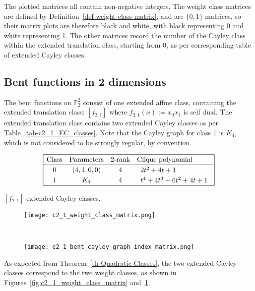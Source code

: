 \documentclass[12pt,a4paper]{article}
\newcommand{\mb}[1]{\mathbb{#1}}
\newcommand{\F}{\mb{F}}
\begin{document}
The plotted matrices all contain non-negative integers.
The weight class matrices are defined by Definition~\ref{def-weight-class-matrix}, and are $\{0,1\}$ matrices,
so their matrix plots are therefore black and white, with black representing 0 and white representing 1.
The other matrices record the number of the Cayley class within the
extended translation class, starting from 0, as per corresponding table of extended Cayley classes.

\subsection{Bent functions in 2 dimensions}
%
The bent functions on $\F_2^2$ consist of one extended affine class, containing the extended translation class: $[f_{2,1}]$
where $f_{2,1}(x) := x_0 x_1$ is self dual.
The extended translation class contains two extended Cayley classes as per Table~\ref{tab-c2_1_EC_classes}.
Note that the Cayley graph for class 1 is $K_4$, which is not considered to be strongly regular, by convention.
\begin{table}[!bhpt] %
\small{
\begin{align*}
\def\arraystretch{1.2}
\begin{array}{|cccl|}
\hline
\text{Class} &
\text{Parameters} &
\text{2-rank} &
\text{Clique polynomial}
\\
\hline
0 &
(4, 1, 0, 0) &
4 &
\begin{array}{l}
2t^{2} + 4t + 1
\end{array}
\\
1 &
K_4 &
4 &
\begin{array}{l}
t^{4} + 4t^{3} + 6t^{2} + 4t + 1
\end{array}
\\
\hline
\end{array}
\end{align*}
}
\caption{$[f_{2,1}]$ extended Cayley classes.}
\label{tab-c2_1_EC_classes}
\end{table}

\begin{figure}[!ht]
\centering
\begin{minipage}{.48\textwidth}
  \centering
  \texttt{[image: c2\_1\_weight\_class\_matrix.png]}
  \label{fig:c2_1_weight_class_matrix}
\end{minipage}%
~~~~
\begin{minipage}{.48\textwidth}
  \centering
  \texttt{[image: c2\_1\_bent\_cayley\_graph\_index\_matrix.png]}
  \label{fig:c2_1_bent_cayley_graph_index_matrix}
\end{minipage}
\end{figure}
As expected from Theorem~\ref{th-Quadratic-Classes},
the two extended Cayley classes correspond to the two weight classes,
as shown in Figures~\ref{fig:c2_1_weight_class_matrix} and~\ref{fig:c2_1_bent_cayley_graph_index_matrix}.
\end{document}
